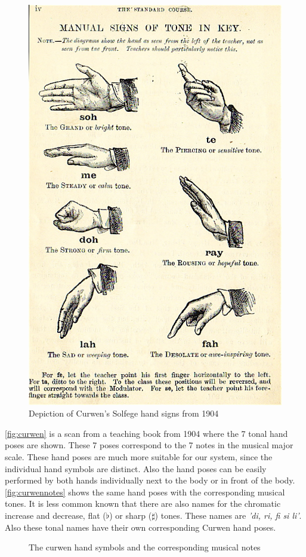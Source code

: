 \begin{figure}[tb]
	\centering{}
	\includegraphics[width=0.4\linewidth]{figures/curwen.jpg}
	\caption{Depiction of Curwen's Solfege hand signs from 1904}
	\label{fig:curwen}
\end{figure}

\autoref{fig:curwen} is a scan from a teaching book from 1904 where the 7 tonal hand poses are shown. These 7 poses correspond to the 7 notes in the musical major scale. These hand poses are much more suitable for our system, since the individual hand symbols are distinct. Also the hand poses can be easily performed by both hands individually next to the body or in front of the body. \autoref{fig:curwennotes} shows the same hand poses with the corresponding musical tones. It is less common known that there are also names for the chromatic increase and decrease, flat ($\flat$) or sharp ($\sharp$) tones. These names are \emph{'di, ri, fi si li'}. Also these tonal names have their own corresponding Curwen hand poses.

\begin{figure}[tb]
	\center{}
	\hspace{0.03\linewidth}
	\caption{The curwen hand symbols and the corresponding musical notes}
	\label{fig:curwennotes}
\end{figure}


